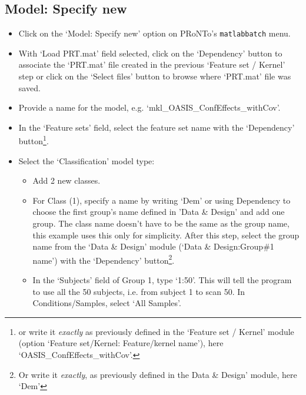 
\subsection{Model: Specify new}

\begin{itemize}

\item Click on the `Model: Specify new' option on PRoNTo's {\tt matlabbatch} menu.
	
\item With `Load PRT.mat' field selected, click on the `Dependency' button to associate the `PRT.mat' file created in the previous `Feature set / Kernel' step or click on the `Select files' button to browse where `PRT.mat' file was saved.

\item Provide a name for the model, e.g. `mkl\_OASIS\_ConfEffects\_withCov'.   

\item In the `Feature sets' field, select the feature set name with the `Dependency' button\footnote{or write it {\it exactly} as previously defined in the `Feature set / Kernel' module (option `Feature set/Kernel: Feature/kernel name'), here `OASIS\_ConfEffects\_withCov'.}.
	
	\item Select the `Classification' model type:
	
		\begin{itemize}
		
		\item Add 2 new classes.
		
		\item For Class (1), specify a name by writing `Dem' or using Dependency to choose the first group's name defined in 'Data \& Design' and add one group. The class name doesn't have to be the same as the group name, this example uses this only for simplicity. After this step, select the group name from the `Data \& Design' module (`Data \& Design:Group\#1 name') with the `Dependency' button\footnote{Or write it {\it exactly}, as previously defined in the Data \& Design' module, here `Dem'}.
		
		\item In the `Subjects' field of Group 1, type `1:50'. This will tell the program to use all the 50 subjects, i.e. from subject 1 to scan 50. In Conditions/Samples, select `All Samples'. 
		

\end{itemize}
\end{itemize}
